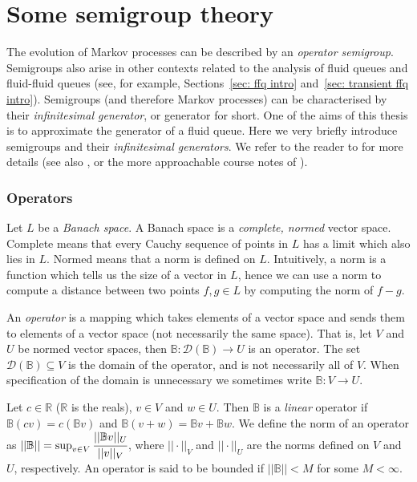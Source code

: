 \section{Some semigroup theory}
The evolution of Markov processes can be described by an \emph{operator semigroup}. Semigroups also arise in other contexts related to the analysis of fluid queues and fluid-fluid queues (see, for example, Sections~\ref{sec: ffq intro} and~\ref{sec: transient ffq intro}). Semigroups (and therefore Markov processes) can be characterised by their \emph{infinitesimal generator}, or generator for short. One of the aims of this thesis is to approximate the generator of a fluid queue. Here we very briefly introduce semigroups and their \emph{infinitesimal generators}. We refer to the reader to \cite{ethierkurtz} for more details (see also \cite{kallenberg}, or the more approachable course notes of \cite{shalizi}). 

\subsubsection{Operators}
Let \(L\) be a \emph{Banach space}. A Banach space is a \emph{complete, normed} vector space. Complete means that every Cauchy sequence of points in \(L\) has a limit which also lies in \(L\). Normed means that a norm is defined on \(L\). Intuitively, a norm is a function which tells us the size of a vector in \(L\), hence we can use a norm to compute a distance between two points \(f,g\in L\) by computing the norm of \(f-g\). 

An \emph{operator} is a mapping which takes elements of a vector space and sends them to elements of a vector space (not necessarily the same space). That is, let \(V\) and \(U\) be normed vector spaces, then \(\mathbb B:\mathcal D(\mathbb B)\to U\) is an operator. The set \(\mathcal D(\mathbb B)\subseteq V\) is the domain of the operator, and is not necessarily all of \(V\). When specification of the domain is unnecessary we sometimes write \(\mathbb B:V\to U\). 

Let \(c\in \mathbb R\) (\(\mathbb R\) is the reals), \(v\in V\) and \(w\in U\). Then \(\mathbb B\) is a \emph{linear} operator if \(\mathbb B(cv) = c(\mathbb Bv)\) and \(\mathbb B(v+w)=\mathbb Bv+\mathbb Bw\). We define the norm of an operator as \(||\mathbb B||=\sup_{v\in V}\cfrac{||\mathbb Bv||_U}{||v||_V}\), where \(||\cdot||_V\) and \(||\cdot||_U\) are the norms defined on \(V\) and \(U\), respectively.  An operator is said to be bounded if \(||\mathbb B||<M\) for some \(M<\infty\). 

